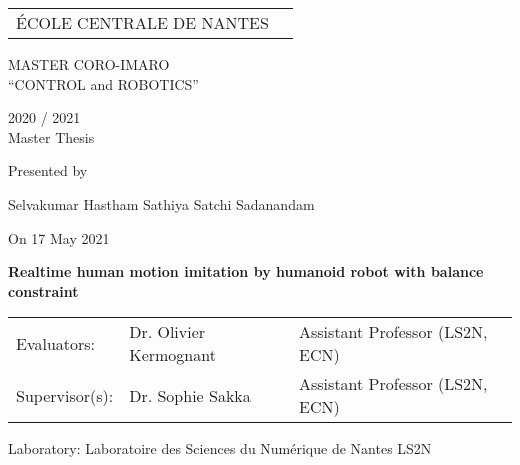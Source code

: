 \thispagestyle{empty}

\def\lskip{\vspace{0.5cm}}


\begin{tabular}{p{7cm}p{8cm}}
ÉCOLE CENTRALE DE NANTES
&
\end{tabular}

\vspace{2cm}

\begin{center} \large\sc MASTER CORO-IMARO\\ \normalsize{``CONTROL and ROBOTICS''} \end{center}



\begin{center}
	2020 / 2021\\
	\lskip
	Master Thesis %
	\lskip
	
	Presented by \lskip 
	
	Selvakumar Hastham Sathiya Satchi Sadanandam \lskip
	
	On 17 May 2021 \lskip\lskip
	
	{\Large \textbf{Realtime human motion imitation by humanoid robot with balance constraint}}
	
	\vfill

		
	\end{center}
	


\begin{tabular}{p{3cm}p{5cm}p{7cm} }
 Evaluators: & Dr. Olivier Kermognant & Assistant Professor (LS2N, ECN) \\
  Supervisor(s):  & Dr. Sophie Sakka & Assistant Professor (LS2N, ECN) \\
\end{tabular}

\lskip

\begin{flushleft}
 Laboratory: Laboratoire des Sciences du Numérique de Nantes LS2N
\end{flushleft}

\newpage
\thispagestyle{empty}
\null
\newpage
\addtocounter{page}{-1}
\pagestyle{fancy}
